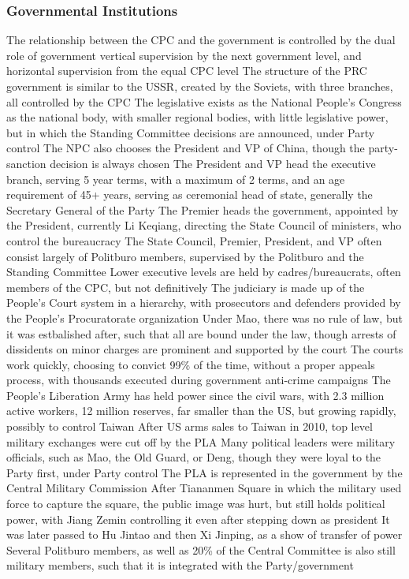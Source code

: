 \documentclass[11 pt, twoside]{article}
\newenvironment{outline*}
{
	\begin{outline}[enumerate]
	}
	{\end{outline}
}
\begin{document}
\subsubsection{Governmental Institutions}
\begin{outline*}
\1 The relationship between the CPC and the government is controlled by the dual role of government vertical supervision by the next government level, and horizontal supervision from the equal CPC level
\1 The structure of the PRC government is similar to the USSR, created by the Soviets, with three branches, all controlled by the CPC
\2 The legislative exists as the National People's Congress as the national body, with smaller regional bodies, with little legislative power, but in which the Standing Committee decisions are announced, under Party control
\3 The NPC also chooses the President and VP of China, though the party-sanction decision is always chosen
\2 The President and VP head the executive branch, serving 5 year terms, with a maximum of 2 terms, and an age requirement of 45+ years, serving as ceremonial head of state, generally the Secretary General of the Party
\3 The Premier heads the government, appointed by the President, currently Li Keqiang, directing the State Council of ministers, who control the bureaucracy
\3 The State Council, Premier, President, and VP often consist largely of Politburo members, supervised by the Politburo and the Standing Committee
\3 Lower executive levels are held by cadres/bureaucrats, often members of the CPC, but not definitively
\2 The judiciary is made up of the People's Court system in a hierarchy, with prosecutors and defenders provided by the People's Procuratorate organization
\3 Under Mao, there was no rule of law, but it was estbalished after, such that all are bound under the law, though arrests of dissidents on minor charges are prominent and supported by the court
\3 The courts work quickly, choosing to convict 99\% of the time, without a proper appeals process, with thousands executed during government anti-crime campaigns
\1 The People's Liberation Army has held power since the civil wars, with 2.3 million active workers, 12 million reserves, far smaller than the US, but growing rapidly, possibly to control Taiwan
\2 After US arms sales to Taiwan in 2010, top level military exchanges were cut off by the PLA
\2 Many political leaders were military officials, such as Mao, the Old Guard, or Deng, though they were loyal to the Party first, under Party control
\2 The PLA is represented in the government by the Central Military Commission
\2 After Tiananmen Square in which the military used force to capture the square, the public image was hurt, but still holds political power, with Jiang Zemin controlling it even after stepping down as president
\3 It was later passed to Hu Jintao and then Xi Jinping, as a show of transfer of power
\3 Several Politburo members, as well as 20\% of the Central Committee is also still military members, such that it is integrated with the Party/government
\end{outline*}
\end{document}
